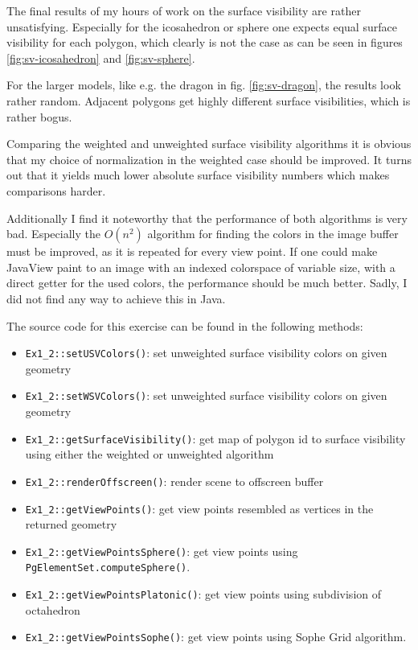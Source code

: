 \documentclass[a4paper,10pt,notitlepage]{scrreprt}
\begin{document}
The final results of my hours of work on the surface visibility are rather
unsatisfying. Especially for the icosahedron or sphere one expects equal
surface visibility for each polygon, which clearly is not the case as can be
seen in figures \ref{fig:sv-icosahedron} and \ref{fig:sv-sphere}.

For the larger models, like e.g. the dragon in fig. \ref{fig:sv-dragon}, the
results look rather random. Adjacent polygons get highly different surface
visibilities, which is rather bogus.

Comparing the weighted and unweighted surface visibility algorithms it is
obvious that my choice of normalization in the weighted case should be
improved. It turns out that it yields much lower absolute surface visibility
numbers which makes comparisons harder.

Additionally I find it noteworthy that the performance of both algorithms is
very bad. Especially the $O(n^2)$ algorithm for finding the colors in the
image buffer must be improved, as it is repeated for every view point. If one
could make JavaView paint to an image with an indexed colorspace of variable
size, with a direct getter for the used colors, the performance should be much
better. Sadly, I did not find any way to achieve this in Java.

The source code for this exercise can be found in the following methods:

\begin{itemize}
 \item \texttt{Ex1\_2::setUSVColors()}: set unweighted surface visibility
colors on given geometry
 \item \texttt{Ex1\_2::setWSVColors()}: set unweighted surface visibility
colors on given geometry
 \item \texttt{Ex1\_2::getSurfaceVisibility()}: get map of polygon id to
surface visibility using either the weighted or unweighted algorithm
 \item \texttt{Ex1\_2::renderOffscreen()}: render scene to offscreen buffer
 \item \texttt{Ex1\_2::getViewPoints()}: get view points resembled as vertices
in the returned geometry
 \item \texttt{Ex1\_2::getViewPointsSphere()}: get view points using
\texttt{PgElementSet.computeSphere()}.
 \item \texttt{Ex1\_2::getViewPointsPlatonic()}: get view points using
subdivision of octahedron
 \item \texttt{Ex1\_2::getViewPointsSophe()}: get view points using Sophe Grid
algorithm.
\end{itemize}
\end{document}
